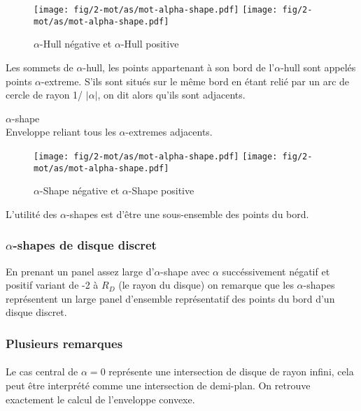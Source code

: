 \begin{figure}[h!]
  \centering
  \texttt{[image: fig/2-mot/as/mot-alpha-shape.pdf]}
  \texttt{[image: fig/2-mot/as/mot-alpha-shape.pdf]}
  \caption{$\alpha$-Hull négative et $\alpha$-Hull positive }
\end{figure}


       

Les sommets de $\alpha$-hull, les points appartenant à son bord de l'$\alpha$-hull sont appelés points $\alpha$-extreme. S'ils sont situés sur le même bord en étant relié par un arc de cercle de rayon 1/ $\lvert \alpha \rvert$, on dit alors qu'ils sont adjacents.

\begin{Definition}{$\alpha$-shape}\\
\label{def:as}
      Enveloppe reliant tous les $\alpha$-extremes adjacents.
\end{Definition}

\begin{figure}[h!]
  \centering
  \texttt{[image: fig/2-mot/as/mot-alpha-shape.pdf]}
  \texttt{[image: fig/2-mot/as/mot-alpha-shape.pdf]}
  \caption{$\alpha$-Shape négative et $\alpha$-Shape positive }
\end{figure}

L'utilité des $\alpha$-shapes est d'être une sous-ensemble des points du bord. 

\subsubsection{$\alpha$-shapes de disque discret}

En prenant un panel assez large d'$\alpha$-shape avec $\alpha$ succéssivement négatif et positif variant de -2 à $R_D$ (le rayon du disque) on remarque que les $\alpha$-shapes représentent un large panel d'ensemble représentatif des points du bord d'un disque discret.


\subsubsection{Plusieurs remarques}

\paragraph{}
Le cas central de $\alpha = 0$ représente une intersection de disque de rayon infini, cela peut être interprété comme une intersection de demi-plan. On retrouve exactement le calcul de l'enveloppe convexe.

